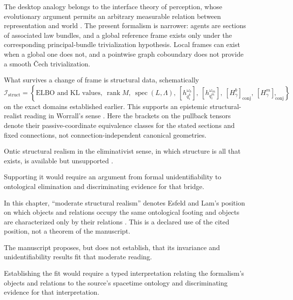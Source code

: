 The desktop analogy belongs to the interface theory of perception, whose
evolutionary argument permits an arbitrary measurable relation between
representation and world \citep{Hoffman2015,Hoffman2019}.  The present
formalism is narrower: agents are sections of associated law bundles, and a
global reference frame exists only under the corresponding principal-bundle
trivialization hypothesis.  Local frames can exist when a global one does
not, and a pointwise graph coboundary does not provide a smooth
\v{C}ech trivialization. 

What survives a change of frame is structural data, schematically
\begin{equation}
\mathcal I_{\mathrm{struct}}
=\left\{
\text{ELBO and KL values},\
\operatorname{rank}M,\
\operatorname{spec}(L,\Lambda),\
[h_{q_i^b}^{\omega_b}],\
[h_{q_i^m}^{\omega_m}],\
[H_\gamma^b]_{\mathrm{conj}},\
[H_\gamma^m]_{\mathrm{conj}}
\right\},
\label{eq:phil-invariants}
\end{equation}
on the exact domains established earlier.  This supports an epistemic
structural-realist reading in Worrall's sense \citep{Worrall1989}.
Here the brackets on the pullback tensors denote their passive-coordinate
equivalence classes for the stated sections and fixed connections, not
connection-independent canonical geometries. 

Ontic
structural realism in the eliminativist sense, in which structure is all that
exists, is available but unsupported \citep{Ladyman2007,Ladyman2014}.
\status{OPEN}

Supporting it would require an argument from formal
unidentifiability to ontological elimination and discriminating evidence for
that bridge. \status{OPEN}

In this chapter, ``moderate structural realism'' denotes Esfeld
and Lam's position on which objects and relations occupy the same ontological
footing and objects are characterized only by their relations
\citep{esfeld2008moderate}. This is a declared use of the cited position, not a
theorem of the manuscript. 

The manuscript proposes, but does not establish, that its
invariance and unidentifiability results fit that moderate reading.

Establishing the fit would require a typed interpretation
relating the formalism's objects and relations to the source's spacetime
ontology and discriminating evidence for that interpretation. \status{OPEN}

